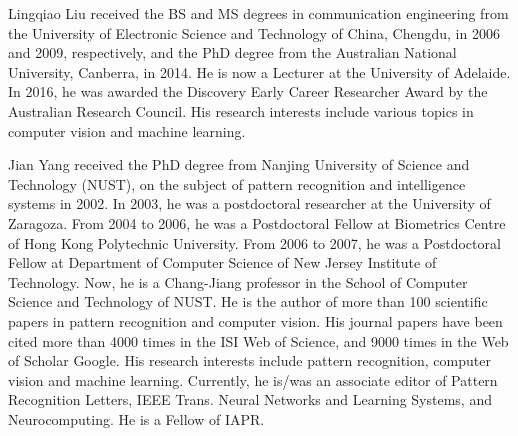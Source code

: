 \begin{IEEEbiography}
{Lingqiao Liu} received the BS and MS degrees in communication engineering from the University of Electronic Science and Technology of China, Chengdu, in 2006 and 2009, respectively, and the PhD degree from the Australian National University, Canberra, in 2014. He is now a Lecturer at the University of Adelaide. In 2016, he was awarded the Discovery Early Career Researcher Award by the Australian Research Council. His research interests include various topics in computer vision and machine learning.
\end{IEEEbiography}


\begin{IEEEbiography}
{Jian Yang} received the PhD degree from Nanjing University of Science and Technology (NUST), on the subject of pattern recognition and intelligence systems in 2002. In 2003, he was a postdoctoral researcher at the University of Zaragoza. From 2004 to 2006, he was a Postdoctoral Fellow at Biometrics Centre of Hong Kong Polytechnic University. From 2006 to 2007, he was a Postdoctoral Fellow at Department of Computer Science of New Jersey Institute of Technology. Now, he is a Chang-Jiang professor in the School of Computer Science and Technology of NUST. He is the author of more than 100 scientific papers in pattern recognition and computer vision. His journal papers have been cited more than 4000 times in the ISI Web of Science, and 9000 times in the Web of Scholar Google. His research interests include pattern recognition, computer vision and machine learning. Currently, he is/was an associate editor of Pattern Recognition Letters, IEEE Trans. Neural Networks and Learning Systems, and Neurocomputing. He is a Fellow of IAPR.\end{IEEEbiography}




